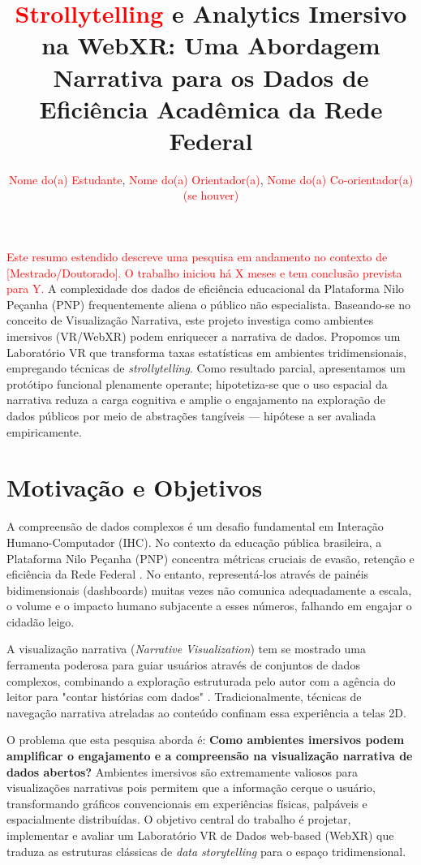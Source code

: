 \documentclass[12pt]{article}
\title{\textcolor{red}{Strollytelling} e Analytics Imersivo na WebXR: Uma Abordagem Narrativa para os Dados de Eficiência Acadêmica da Rede Federal}
\author{\textcolor{red}{Nome do(a) Estudante}\inst{1}, \textcolor{red}{Nome do(a) Orientador(a)}\inst{1}, \textcolor{red}{Nome do(a) Co-orientador(a) (se houver)}\inst{2}}
\begin{document}
 

\maketitle

\begin{resumo} 
  \textcolor{red}{Este resumo estendido descreve uma pesquisa em andamento no contexto de [Mestrado/Doutorado]. O trabalho iniciou há X meses e tem conclusão prevista para Y.} A complexidade dos dados de eficiência educacional da Plataforma Nilo Peçanha (PNP) frequentemente aliena o público não especialista. Baseando-se no conceito de Visualização Narrativa, este projeto investiga como ambientes imersivos (VR/WebXR) podem enriquecer a narrativa de dados. Propomos um Laboratório VR que transforma taxas estatísticas em ambientes tridimensionais, empregando técnicas de \textit{strollytelling}. Como resultado parcial, apresentamos um protótipo funcional plenamente operante; hipotetiza-se que o uso espacial da narrativa reduza a carga cognitiva e amplie o engajamento na exploração de dados públicos por meio de abstrações tangíveis --- hipótese a ser avaliada empiricamente.
\end{resumo}

\section{Motivação e Objetivos}
A compreensão de dados complexos é um desafio fundamental em Interação Humano-Computador (IHC). No contexto da educação pública brasileira, a Plataforma Nilo Peçanha (PNP) concentra métricas cruciais de evasão, retenção e eficiência da Rede Federal \cite{mec2024pnp}. No entanto, representá-los através de painéis bidimensionais (dashboards) muitas vezes não comunica adequadamente a escala, o volume e o impacto humano subjacente a esses números, falhando em engajar o cidadão leigo.

A visualização narrativa (\textit{Narrative Visualization}) tem se mostrado uma ferramenta poderosa para guiar usuários através de conjuntos de dados complexos, combinando a exploração estruturada pelo autor com a agência do leitor para "contar histórias com dados" \cite{segel2010narrative}. Tradicionalmente, técnicas de navegação narrativa atreladas ao conteúdo confinam essa experiência a telas 2D. 

O problema que esta pesquisa aborda é: \textbf{Como ambientes imersivos podem amplificar o engajamento e a compreensão na visualização narrativa de dados abertos?} Ambientes imersivos são extremamente valiosos para visualizações narrativas pois permitem que a informação cerque o usuário, transformando gráficos convencionais em experiências físicas, palpáveis e espacialmente distribuídas. O objetivo central do trabalho é projetar, implementar e avaliar um Laboratório VR de Dados web-based (WebXR) que traduza as estruturas clássicas de \textit{data storytelling} para o espaço tridimensional.
\end{document}
